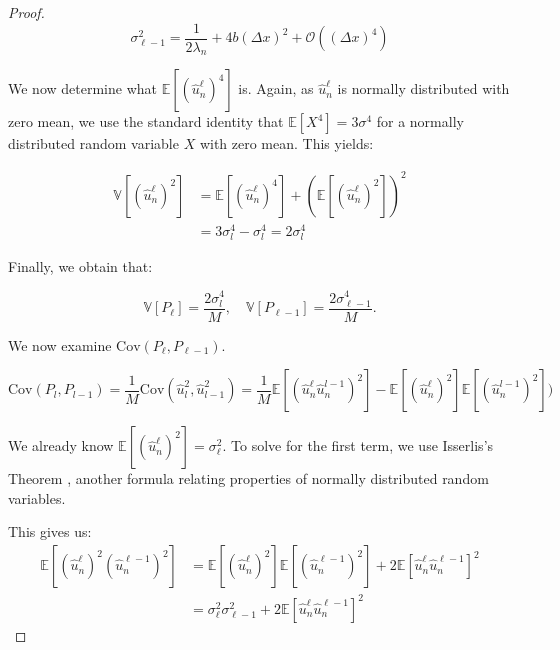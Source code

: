\begin{proof}
    \begin{equation}\label{eq:sigma_ell_1_var}
        \sigma_{\ell-1}^2 = \frac{1}{2\lambda_n} + 4b(\Delta x)^2 + 
        \mathcal{O}\left((\Delta x)^4\right)
    \end{equation}

    We now determine what $\mathbb{E}\left[(\hat{u}_n^\ell)^4\right]$ is.
    Again, as $\hat{u}_n^\ell$ is normally distributed with zero mean, we use
    the standard identity that $\mathbb{E}[X^4] = 3 \sigma^4$ for 
    a normally distributed random variable $X$ with zero mean.
    This yields:

    \begin{align*}
        \mathbb{V}[(\hat{u}_n^\ell)^2] &= 
        \mathbb{E}[(\hat{u}_n^\ell)^4] + 
        \left(\mathbb{E}[(\hat{u}_n^\ell)^2]\right)^2 \\
        &= 3\sigma_l^4 - \sigma_l^4 = 2\sigma_l^4
    \end{align*}

    Finally, we obtain that:

    \begin{equation}\label{eq:P_var_estimates}
        \mathbb{V}[P_\ell] = \frac{2\sigma_l^4}{M}, \quad 
        \mathbb{V}[P_{\ell-1}] = \frac{2\sigma_{\ell-1}^4}{M}.
    \end{equation}

    We now examine $\mathrm{Cov}\left(P_\ell, P_{\ell-1}\right)$.

    \begin{equation*}
        \mathrm{Cov}(P_l, P_{l-1}) = 
        \frac{1}{M}\mathrm{Cov}(\hat{u}_l^2, \hat{u}_{l-1}^2) 
        = \frac{1}{M}\mathbb{E}[(\hat{u}_n^\ell \hat{u}_n^{l-1})^2] 
        - \mathbb{E}[(\hat{u}_n^\ell)^2]\mathbb{E}[(\hat{u}_n^{l-1})^2])
    \end{equation*}

    We already know $\mathbb{E}[(\hat{u}_n^\ell)^2] = \sigma_\ell^2$.
    To solve for the first term, we use Isserlis's Theorem 
    \cite{isserlis1918formula}, another 
    formula relating properties of normally distributed random variables.

    This gives us:
    \begin{align*}
        \mathbb{E}\left[(\hat{u}_n^\ell)^2(\hat{u}_n^{\ell-1})^2\right] 
        &= \mathbb{E}[(\hat{u}_n^{\ell})^2]\mathbb{E}[(\hat{u}_n^{\ell-1})^2]
         + 2\mathbb{E}[\hat{u}_n^\ell \hat{u}_n^{\ell-1}]^2 \\
        &= \sigma_\ell^2 \sigma_{\ell-1}^2 + 
        2\mathbb{E}[\hat{u}_n^\ell \hat{u}_n^{\ell-1}]^2
    \end{align*}


\end{proof}
